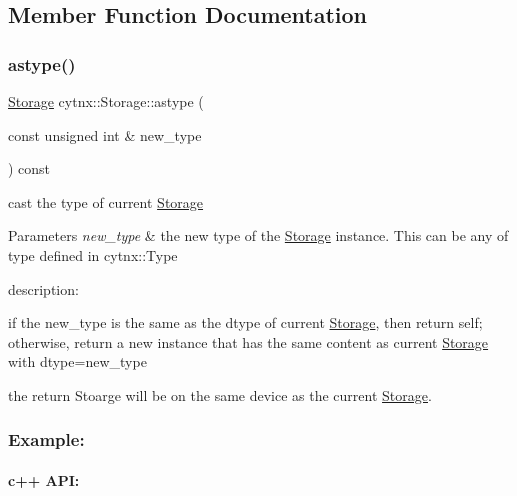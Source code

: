 \subsection{Member Function Documentation}
\mbox{\label{classcytnx_1_1Storage_a8310d8dbb70510272ded2e3d01be25f0}} 
\subsubsection{\texorpdfstring{astype()}{astype()}}
{\footnotesize\ttfamily \hyperlink{classcytnx_1_1Storage}{Storage} cytnx\+::\+Storage\+::astype (\begin{DoxyParamCaption}\item[{const unsigned int \&}]{new\+\_\+type }\end{DoxyParamCaption}) const\hspace{0.3cm}{\ttfamily [inline]}}



cast the type of current \hyperlink{classcytnx_1_1Storage}{Storage} 


\begin{DoxyParams}{Parameters}
{\em new\+\_\+type} & the new type of the \hyperlink{classcytnx_1_1Storage}{Storage} instance. This can be any of type defined in cytnx\+::\+Type\\
\hline
\end{DoxyParams}
description\+:
\begin{DoxyEnumerate}
\item if the new\+\_\+type is the same as the dtype of current \hyperlink{classcytnx_1_1Storage}{Storage}, then return self; otherwise, return a new instance that has the same content as current \hyperlink{classcytnx_1_1Storage}{Storage} with dtype=new\+\_\+type
\item the return Stoarge will be on the same device as the current \hyperlink{classcytnx_1_1Storage}{Storage}.
\end{DoxyEnumerate}

\subsubsection*{Example\+:}

\paragraph*{c++ A\+PI\+:}


